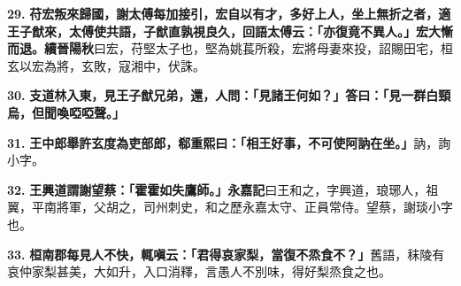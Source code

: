 \textbf{29.} \textbf{苻宏叛來歸國，謝太傅每加接引，宏自以有才，多好上人，坐上無折之者，適王子猷來，太傅使共語，子猷直孰視良久，回語太傅云：「亦復竟不異人。」宏大慚而退。}{\footnotesize \textbf{續晉陽秋}曰宏，苻堅太子也，堅為姚萇所殺，宏將母妻來投，詔賜田宅，桓玄以宏為將，玄敗，寇湘中，伏誅。}

\textbf{30.} \textbf{支道林入東，見王子猷兄弟，還，人問：「見諸王何如？」答曰：「見一群白頸烏，但聞喚啞啞聲。」}

\textbf{31.} \textbf{王中郎舉許玄度為吏部郎，郗重熙曰：「相王好事，不可使阿訥在坐。」}{\footnotesize 訥，詢小字。}

\textbf{32.} \textbf{王興道謂謝望蔡：「霍霍如失鷹師。」}{\footnotesize \textbf{永嘉記}曰王和之，字興道，琅琊人，祖翼，平南將軍，父胡之，司州刺史，和之歷永嘉太守、正員常侍。望蔡，謝琰小字也。}

\textbf{33.} \textbf{桓南郡每見人不快，輒嗔云：「君得哀家梨，當復不烝食不？」}{\footnotesize 舊語，秣陵有哀仲家梨甚美，大如升，入口消釋，言愚人不別味，得好梨烝食之也。}